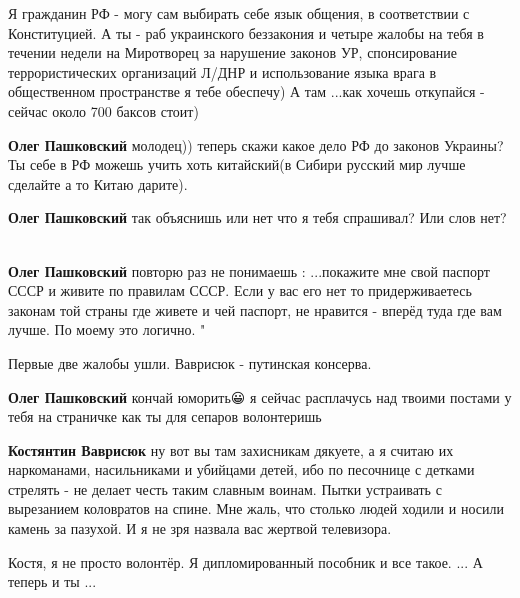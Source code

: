 \begin{itemize}
\begin{itemize}

Я гражданин РФ - могу сам выбирать себе язык общения, в соответствии с
Конституцией. А ты - раб украинского беззакония и четыре жалобы на тебя в
течении недели на Миротворец за нарушение законов УР, спонсирование
террористических организаций Л/ДНР и использование языка врага в общественном
пространстве я тебе обеспечу) А там ...как хочешь откупайся - сейчас около 700
баксов стоит)

\textbf{Олег Пашковский} молодец)) теперь скажи какое дело РФ до законов
Украины? Ты себе в РФ можешь учить хоть китайский(в Сибири русский мир лучше
сделайте а то Китаю дарите).


\textbf{Олег Пашковский} так объяснишь или нет что я тебя спрашивал? Или слов нет? 🤣


\textbf{Олег Пашковский} повторю раз не понимаешь : ...покажите мне свой
паспорт СССР и живите по правилам СССР. Если у вас его нет то придерживаетесь
законам той страны где живете и чей паспорт, не нравится - вперёд туда где вам
лучше. По моему это логично. "

Первые две жалобы ушли. Ваврисюк - путинская консерва.


\textbf{Олег Пашковский} кончай юморить😀 я сейчас расплачусь над твоими
постами у тебя на страничке как ты для сепаров волонтеришь🤣🤣🤣🤣


\textbf{Костянтин Ваврисюк} ну вот вы там захисникам дякуете, а я считаю их
наркоманами, насильниками и убийцами детей, ибо по песочнице с детками стрелять
- не делает честь таким славным воинам. Пытки устраивать с вырезанием
коловратов на спине. Мне жаль, что столько людей ходили и носили камень за
пазухой. И я не зря назвала вас жертвой телевизора.

Костя, я не просто волонтёр. Я дипломированный пособник и все такое. ... А теперь и ты ...


\end{itemize}
\end{itemize}
